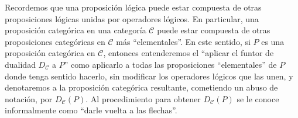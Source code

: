 \documentclass[tesis]{subfiles}
\begin{document}
%
%    
%
%


Recordemos que una proposición lógica puede estar compuesta de otras proposiciones lógicas unidas por operadores lógicos. En particular, una proposición categórica en una categoría $\mathscr{C}$ puede estar compuesta de otras proposiciones categóricas en $\mathscr{C}$ más ``elementales''. En este sentido, si $P$ es una proposición categórica en $\mathscr{C}$, entonces entenderemos el ``aplicar el funtor de dualidad $D_\mathscr{C}$ a $P$'' como aplicarlo a todas las proposiciones ``elementales'' de $P$ donde tenga sentido hacerlo, sin modificar los operadores lógicos que las unen, y denotaremos a la proposición categórica resultante, cometiendo un abuso de notación, por $D_{\mathscr{C}}(P)$. Al procedimiento para obtener $D_\mathscr{C}(P)$ se le conoce informalmente como ``darle vuelta a las flechas''.
\end{document}

